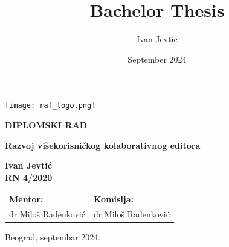 \documentclass[12pt]{article}
\title{Bachelor Thesis}
\author{Ivan Jevtic}
\date{September 2024}
\begin{document}
\begin{titlepage}
	\begin{center}
		         
		\vspace*{-1in}
		\texttt{[image: raf\_logo.png]}
		
		\vspace{1in}
		\Large
		\textbf{DIPLOMSKI RAD}
		         
		\vspace{1in}
		\Huge
		\textbf{Razvoj višekorisničkog kolaborativnog editora}
		         
		\vspace{1in}
		
		
		\fontsize{14pt}{18pt}\selectfont
		\textbf{Ivan Jevtić} \\
		\textbf{RN 4/2020}
		\vspace*{1.5in}
		         
		\begin{center}
			\normalsize
			\begin{tabular}{p{} p{}}
				\fontsize{14pt}{18pt}\selectfont   
				\textbf{Mentor:}      &                       
				            
				\fontsize{14pt}{18pt}\selectfont
				\textbf{Komisija:} \\
				dr Miloš Radenković & dr Miloš Radenković \\
				                                 
			\end{tabular}
		\end{center}
		
		\vspace*{\fill}
		
		\normalsize
		Beograd, septembar 2024.
		
		
		         
	\end{center}
\end{titlepage}
\restoregeometry %

\newpage
{} %
   
\renewcommand{\contentsname}{Sadržaj}
\tableofcontents
\thispagestyle{empty} %
\end{document}
